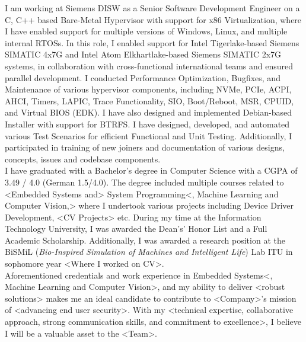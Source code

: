 \documentclass[11pt, a4paper]{awesome-cv}
\begin{document}
\begin{cvletter}
I am working at Siemens DISW as a Senior Software Development Engineer on a C, C++ based Bare-Metal Hypervisor with support for x86 Virtualization, where I have enabled support for multiple versions of Windows, Linux, and multiple internal RTOSs. In this role, I enabled support for Intel Tigerlake-based Siemens SIMATIC 4x7G and Intel Atom Elkhartlake-based Siemens SIMATIC 2x7G systems, in collaboration with cross-functional international teams and ensured parallel development. I conducted Performance Optimization, Bugfixes, and Maintenance of various hypervisor components, including NVMe, PCIe, ACPI, AHCI, Timers, LAPIC, Trace Functionality, SIO, Boot/Reboot, MSR, CPUID, and Virtual BIOS (EDK). I have also designed and implemented Debian-based Installer with support for BTRFS. I have designed, developed, and automated various Test Scenarios for efficient Functional and Unit Testing. Additionally, I participated in training of new joiners and documentation of various designs, concepts, issues and codebase components.
\vspace{5pt}
\\
I have graduated with a Bachelor's degree in Computer Science with a CGPA of 3.49 / 4.0 (German 1.5/4.0). The degree included multiple courses related to <Embedded Systems and> System Programming<, Machine Learning and Computer Vision,> where I undertook various projects including Device Driver Development, <CV Projects> etc. During my time at the Information Technology University, I was awarded the Dean's' Honor List and a Full Academic Scholarship. Additionally, I was awarded a research position at the BiSMiL (\textit{Bio-Inspired Simulation of Machines and Intelligent Life}) Lab ITU in sophomore year <Where I worked on CV>.
\vspace{5pt}
\\
Aforementioned credentials and work experience in Embedded Systems<, Machine Learning and Computer Vision>, and my ability to deliver <robust solutions> makes me an ideal candidate to contribute to <Company>'s mission of <advancing end user security>. With my <technical expertise, collaborative approach, strong communication skills, and commitment to excellence>, I believe I will be a valuable asset to the <Team>.

\end{cvletter}

\makeletterclosing
\end{document}
